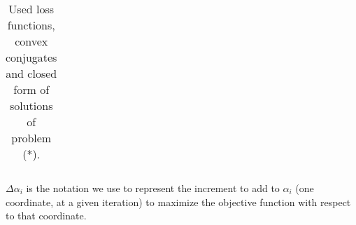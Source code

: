 \documentclass{article}
\begin{document}
\begin{center}
\begin{table}[H]
\begin{tabular}{|c|}
			\hline
		\end{tabular}

		\caption{Used loss functions, convex conjugates and closed form of solutions of problem (*).}
		\label{dataset}
	\end{table}
\end{center}

$\Delta \alpha_i$ is the notation we use to represent the increment to add to $\alpha_i$ (one coordinate, at a given iteration) to maximize the objective function with respect to that coordinate.
\end{document}
